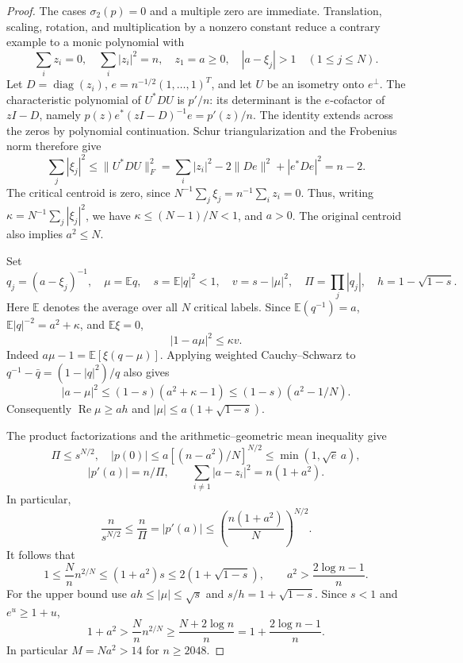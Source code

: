 \documentclass[11pt,reqno]{amsart}
\numberwithin{equation}{section}
\theoremstyle{definition}
\theoremstyle{remark}
\DeclareMathOperator{\diag}{diag}
\renewcommand{\Re}{\operatorname{Re}}
\newcommand{\E}{\mathbb E}
\begin{document}
\begin{proof}
The cases $\sigma_2(p)=0$ and a multiple zero are immediate.
Translation, scaling, rotation, and multiplication by a nonzero
constant reduce a contrary example to a monic polynomial with
\[
 \sum_i z_i=0,\quad \sum_i|z_i|^2=n,\quad z_1=a\ge0,
 \quad |a-\xi_j|>1\quad(1\le j\le N).
\]
Let $D=\diag(z_i)$, $e=n^{-1/2}(1,\ldots,1)^T$, and let $U$ be an
isometry onto $e^\perp$. The characteristic polynomial of $U^*DU$ is
$p'/n$: its determinant is the $e$-cofactor of $zI-D$, namely
$p(z)e^*(zI-D)^{-1}e=p'(z)/n$. The identity extends across the zeros
by polynomial continuation. Schur triangularization and the Frobenius
norm therefore give
\[
 \sum_j|\xi_j|^2\le\|U^*DU\|_F^2
 =\sum_i|z_i|^2-2\|De\|^2+|e^*De|^2=n-2.
\]
The critical centroid is zero, since
$N^{-1}\sum_j\xi_j=n^{-1}\sum_i z_i=0$. Thus, writing
$\kappa=N^{-1}\sum_j|\xi_j|^2$, we have
$\kappa\le(N-1)/N<1$, and $a>0$.
The original centroid also implies $a^2\le N$.

Set
\[
 q_j=(a-\xi_j)^{-1},\quad \mu=\E q,\quad
 s=\E|q|^2<1,\quad v=s-|\mu|^2,\quad
 \Pi=\prod_j|q_j|,\quad h=1-\sqrt{1-s}.
\]
Here $\E$ denotes the average over all $N$ critical labels. Since
$\E(q^{-1})=a$, $\E|q|^{-2}=a^2+\kappa$, and $\E\xi=0$,
\begin{equation}\label{ar:variance-covariance}
 |1-a\mu|^2\le\kappa v.
\end{equation}
Indeed $a\mu-1=\E[\xi(q-\mu)]$.  Applying weighted Cauchy--Schwarz
to $q^{-1}-\bar q=(1-|q|^2)/q$ also gives
\begin{equation}\label{ar:variance-weighted}
 |a-\mu|^2\le(1-s)(a^2+\kappa-1)
 \le(1-s)(a^2-1/N).
\end{equation}
Consequently $\Re\mu\ge ah$ and
$|\mu|\le a(1+\sqrt{1-s})$.

The product factorizations and the arithmetic--geometric mean
inequality give
\[
 \Pi\le s^{N/2},\quad
 |p(0)|\le a[(n-a^2)/N]^{N/2}\le\min(1,\sqrt e\,a),
\]
\[
 |p'(a)|=n/\Pi,\qquad
 \sum_{i\ne1}|a-z_i|^2=n(1+a^2).
\]
In particular,
\[
 \frac n{s^{N/2}}\le\frac n\Pi=|p'(a)|
 \le\left(\frac{n(1+a^2)}N\right)^{N/2}.
\]
It follows that
\begin{equation}\label{ar:variance-moment-range}
 1\le\frac Nn n^{2/N}\le(1+a^2)s
 \le2(1+\sqrt{1-s}),
 \qquad
 a^2>\frac{2\log n-1}{n}.
\end{equation}
For the upper bound use $ah\le|\mu|\le\sqrt s$ and
$s/h=1+\sqrt{1-s}$. Since $s<1$ and $e^u\ge1+u$,
\[
 1+a^2>\frac Nn n^{2/N}
 \ge\frac{N+2\log n}{n}
 =1+\frac{2\log n-1}{n}.
\]
In particular $M=Na^2>14$ for $n\ge2048$.


\end{proof}
\end{document}
